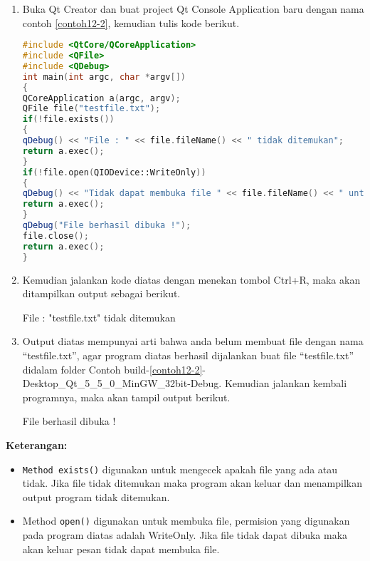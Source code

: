 \begin{enumerate}

\item
  Buka Qt Creator dan buat project Qt Console Application baru dengan
  nama contoh \ref{contoh12-2}, kemudian tulis kode berikut.

\begin{lstlisting}[language=c++, caption=Memeriksa apakah file ada dan bisa diakses, label=contoh12-2]
#include <QtCore/QCoreApplication>
#include <QFile>
#include <QDebug>
int main(int argc, char *argv[])
{
QCoreApplication a(argc, argv);
QFile file("testfile.txt");
if(!file.exists())
{
qDebug() << "File : " << file.fileName() << " tidak ditemukan";
return a.exec();
}
if(!file.open(QIODevice::WriteOnly))
{
qDebug() << "Tidak dapat membuka file " << file.fileName() << " untuk ditulis";
return a.exec();
}
qDebug("File berhasil dibuka !");
file.close();
return a.exec();
}
\end{lstlisting}
\item
  Kemudian jalankan kode diatas dengan menekan tombol Ctrl+R, maka akan
  ditampilkan output sebagai berikut.
  
  \begin{lcverbatim}
File :  "testfile.txt"  tidak ditemukan
  \end{lcverbatim}
\item
  Output diatas mempunyai arti bahwa anda belum membuat file dengan nama
  ``testfile.txt'', agar program diatas berhasil dijalankan buat file
  ``testfile.txt'' didalam folder Contoh build-\ref{contoh12-2}-Desktop\_Qt\_5\_5\_0\_MinGW\_32bit-Debug.
   Kemudian  jalankan kembali programnya, maka akan tampil output berikut.
  
  \begin{lcverbatim}
  	File berhasil dibuka !
  \end{lcverbatim}
  
\end{enumerate}

\textbf{Keterangan:}

\begin{itemize}

\item
  \texttt{Method\ exists()} digunakan untuk mengecek apakah file yang
  ada atau tidak. Jika file tidak ditemukan maka program akan keluar dan
  menampilkan output program tidak ditemukan.
\item
  Method \texttt{open()} digunakan untuk membuka file, permision yang
  digunakan pada program diatas adalah WriteOnly. Jika file tidak dapat
  dibuka maka akan keluar pesan tidak dapat membuka file.
\end{itemize}

